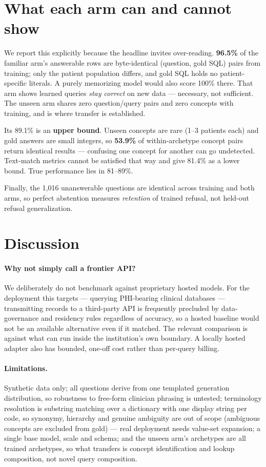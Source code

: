 \documentclass[pmlr,twocolumn,10pt]{jmlr} %
\begin{document}
\section{What each arm can and cannot show}
\label{sec:arms}

We report this explicitly because the headline invites over-reading.
\textbf{96.5\%} of the familiar arm's answerable rows are byte-identical
(question, gold SQL) pairs from training; only the patient population differs,
and gold SQL holds no patient-specific literals. A purely memorizing model would
also score 100\% there. That arm shows learned queries \emph{stay correct} on new
data --- necessary, not sufficient. The unseen arm shares zero question/query
pairs and zero concepts with training, and is where transfer is established.

Its 89.1\% is an \textbf{upper bound}. Unseen concepts are rare (1--3 patients
each) and gold answers are small integers, so \textbf{53.9\%} of within-archetype
concept pairs return identical results --- confusing one concept for another can
go undetected. Text-match metrics cannot be satisfied that way and give 81.4\% as
a lower bound. True performance lies in 81--89\%.

Finally, the 1,016 unanswerable questions are identical across training and both
arms, so perfect abstention measures \emph{retention} of trained refusal, not
held-out refusal generalization.

\section{Discussion}

\paragraph{Why not simply call a frontier API?} We deliberately do not benchmark
against proprietary hosted models. For the deployment this targets --- querying
PHI-bearing clinical databases --- transmitting records to a third-party API is
frequently precluded by data-governance and residency rules regardless of
accuracy, so a hosted baseline would not be an available alternative even if it
matched. The relevant comparison is against what can run inside the
institution's own boundary. A locally hosted adapter also has bounded, one-off
cost rather than per-query billing.

\paragraph{Limitations.} Synthetic data only; all questions derive from one
templated generation distribution, so robustness to free-form clinician phrasing
is untested; terminology resolution is substring matching over a dictionary with
one display string per code, so synonymy, hierarchy and genuine ambiguity are out
of scope (ambiguous concepts are excluded from gold) --- real deployment needs
value-set expansion; a single base model, scale and schema; and the unseen arm's
archetypes are all trained archetypes, so what transfers is concept
identification and lookup composition, not novel query composition.
\end{document}
